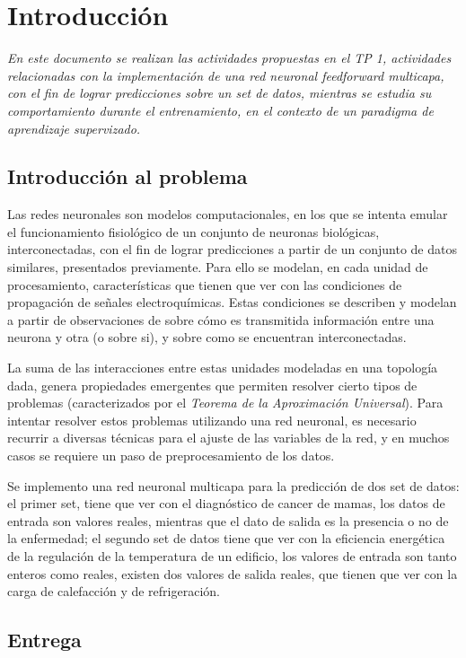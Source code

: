 
\section{Introducción}


\textit{En este documento se realizan las actividades propuestas en el TP 1, actividades relacionadas con la implementación de una red neuronal feedforward multicapa, con el fin de lograr predicciones sobre un set de datos, mientras se estudia su comportamiento durante el entrenamiento, en el contexto de un paradigma de aprendizaje supervizado.}



\subsection{Introducción al problema}
Las redes neuronales son modelos computacionales, en los que se intenta emular el funcionamiento fisiológico de un conjunto de neuronas biológicas, interconectadas, con el fin de lograr predicciones a partir de un conjunto de datos similares, presentados previamente. Para ello se modelan, en cada unidad de procesamiento, características que tienen que ver con las condiciones de propagación de señales electroquímicas. Estas condiciones se describen y modelan a partir de observaciones de sobre cómo es transmitida información entre una neurona y otra (o sobre si), y sobre como se encuentran interconectadas.

La suma de las interacciones entre estas unidades modeladas en una topología dada, genera propiedades emergentes que permiten  resolver cierto tipos de  problemas (caracterizados por el \textit{Teorema de la Aproximación Universal}). 
Para intentar resolver estos problemas utilizando una red neuronal, es necesario recurrir a diversas técnicas para el ajuste de las variables de la red, y en muchos casos se requiere un paso de preprocesamiento de los datos. 

Se implemento una red neuronal multicapa para la predicción de dos set de datos: el primer set, tiene que ver con el diagnóstico de cancer de mamas, los datos de entrada son valores reales, mientras que el dato de salida es la presencia o no de la enfermedad; el segundo set de datos tiene que ver con la eficiencia energética de la regulación de la temperatura de un edificio, los valores de entrada son tanto enteros como reales, existen dos valores de salida reales, que tienen que ver con la carga de calefacción y de refrigeración.  

\subsection{Entrega}
